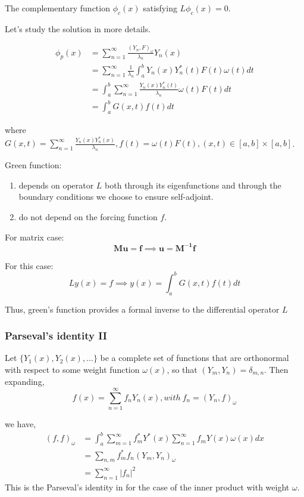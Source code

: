 \documentclass{article}
\theoremstyle{definition}
\begin{document}
The complementary function $\phi_c(x)$ satisfying $L\phi_c(x)=0$.

Let's study the solution in more details.

\begin{align}
\phi_p(x)&=\sum_{n=1}^{\infty} \frac{(Y_n,F)_\omega}{\lambda_n}Y_n(x)\\
		 &=\sum_{n=1}^{\infty}\frac{1}{\lambda_n}\int_{a}^bY_n(x)Y_n^*(t)F(t)\omega (t)dt\\
		 &=\int_a^b \sum_{n=1}^{\infty} \frac{Y_n(x)Y_n^*(t)}{\lambda_n}\omega (t)F(t)dt\\
		 &=\int_a^b G(x,t)f(t)dt
\end{align}

where $G(x,t)=\sum_{n=1}^{\infty}\frac{Y_n(x)Y_n^*(x)}{\lambda_n}, f(t)=\omega(t)F(t), (x,t)\in [a,b]\times [a,b]$.

Green function:
\begin{enumerate}
	\item depends on operator $L$ both through its eigenfunctions and through the boundary conditions we choose to ensure self-adjoint. 
	\item do not depend on the forcing function $f$.
\end{enumerate}

For matrix case:
\begin{equation}
\mathbf{Mu=f} \implies \mathbf{u}=\mathbf{M^{-1}f}
\end{equation}

For this case:
\begin{equation}
Ly(x)=f \implies y(x)=\int_a^b G(x,t)f(t)dt
\end{equation}

Thus, green's function provides a formal inverse to the differential operator $L$

\subsubsection{Parseval's identity II}
Let $\{Y_1(x),Y_2(x),\ldots\}$ be a complete set of functions that are orthonormal with respect to some weight function $\omega(x)$, so that $(Y_m,Y_n)=\delta_{m,n}$. Then expanding,
\begin{equation}
f(x)=\sum_{n=1}^{\infty}f_nY_n(x), with \ f_n=(Y_n,f)_\omega 
\end{equation}


we have,
\begin{align}
(f,f)_\omega &=\int_a^b \sum_{m=1}^{\infty} f^*_mY^*(x) \sum_{n=1}^{\infty} f_mY(x) \omega(x)dx\\
             &=\sum_{n,m} f_m^*f_n(Y_m,Y_n)_\omega\\
             &=\sum_{n=1}^{\infty}|f_n|^2
\end{align}
This is the Parseval's identity in for the case of the inner product with weight $\omega$.
\end{document}
